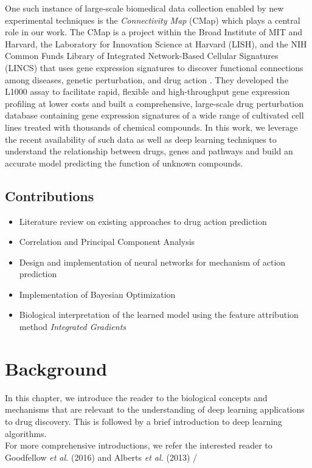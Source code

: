 \documentclass[bsc,frontabs,twoside,singlespacing,parskip,deptreport]{infthesis}     %
\let\Oldsection\section
\renewcommand{\section}{\FloatBarrier\Oldsection}
\begin{document}
One such instance of large-scale biomedical data collection enabled by new experimental techniques is the \textit{Connectivity Map} (CMap) \cite{lamb_connectivity_2006} which plays a central role in our work. The CMap is a project within the Broad Institute of MIT and Harvard, the Laboratory for Innovation Science at Harvard (LISH), and the  NIH  Common  Funds  Library  of  Integrated  Network-Based  Cellular  Signatures (LINCS) that uses gene expression signatures to discover functional connections among diseases, genetic perturbation, and drug action \cite{musa_review_2017}. They developed the L1000 assay to facilitate rapid, flexible and high-throughput gene expression profiling at lower costs \cite{subramanian_next_2017} and built a comprehensive, large-scale drug perturbation database containing gene expression signatures of a wide range of cultivated cell lines treated with thousands of chemical compounds. In this work, we leverage the recent availability of such data as well as deep learning techniques to understand the relationship between drugs, genes and pathways and build an accurate model predicting the function of unknown compounds.


\section{Contributions}
\begin{itemize}
\item Literature review on existing approaches to drug action prediction 
\item Correlation and Principal Component Analysis
\item Design and implementation of neural networks for mechanism of action prediction
\item Implementation of Bayesian Optimization
\item Biological interpretation of the learned model using the feature attribution method \textit{Integrated Gradients}

\end{itemize}

\chapter{Background}
In this chapter, we introduce the reader to the biological concepts and mechanisms that are relevant to the understanding of deep learning applications to drug discovery. This is followed by a brief introduction to deep learning algorithms. \\
For more comprehensive introductions, we refer the interested reader to Goodfellow \textit{et al.} (2016) \cite{goodfellow_deep_2016} and Alberts \textit{et al.} (2013) \cite{alberts_essential_2013}/
\end{document}
